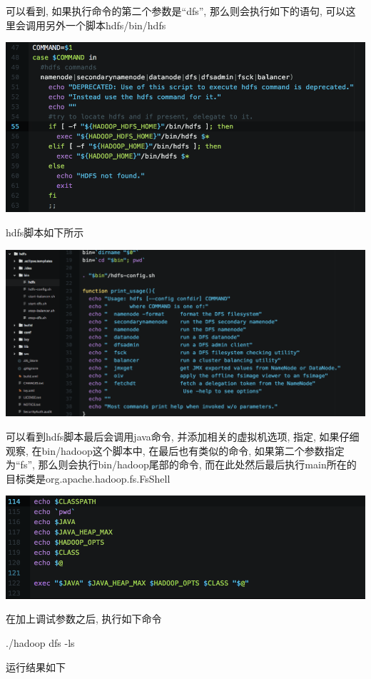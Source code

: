 可以看到, 如果执行命令的第二个参数是``dfs'', 那么则会执行如下的语句, 可以这里会调用另外一个脚本hdfs/bin/hdfs

\includegraphics[width=\textwidth]{image/env/cr17.png}

hdfs脚本如下所示

\includegraphics[width=\textwidth]{image/env/cr18.png}

可以看到hdfs脚本最后会调用java命令, 并添加相关的虚拟机选项, 指定{\CPATH}, 如果仔细观察, 在bin/hadoop这个脚本中, 在最后也有类似的命令, 如果第二个参数指定为``fs'', 那么则会执行bin/hadoop尾部的命令, 而在此处然后最后执行main所在的目标类是org.apache.hadoop.fs.FsShell

\includegraphics[width=\textwidth]{image/env/cr19.png}

在加上调试参数之后, 执行如下命令

	 ./hadoop dfs -ls

运行结果如下

